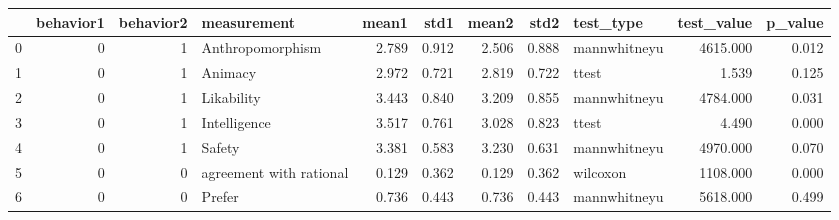\begin{tabular}{lrrlrrrrlrr}
\toprule
{} &  behavior1 &  behavior2 &              measurement &  mean1 &   std1 &  mean2 &   std2 &     test\_type &  test\_value &  p\_value \\
\midrule
0 &          0 &          1 &         Anthropomorphism &  2.789 &  0.912 &  2.506 &  0.888 &  mannwhitneyu &    4615.000 &    0.012 \\
1 &          0 &          1 &                  Animacy &  2.972 &  0.721 &  2.819 &  0.722 &         ttest &       1.539 &    0.125 \\
2 &          0 &          1 &               Likability &  3.443 &  0.840 &  3.209 &  0.855 &  mannwhitneyu &    4784.000 &    0.031 \\
3 &          0 &          1 &             Intelligence &  3.517 &  0.761 &  3.028 &  0.823 &         ttest &       4.490 &    0.000 \\
4 &          0 &          1 &                   Safety &  3.381 &  0.583 &  3.230 &  0.631 &  mannwhitneyu &    4970.000 &    0.070 \\
5 &          0 &          0 &  agreement with rational &  0.129 &  0.362 &  0.129 &  0.362 &      wilcoxon &    1108.000 &    0.000 \\
6 &          0 &          0 &                   Prefer &  0.736 &  0.443 &  0.736 &  0.443 &  mannwhitneyu &    5618.000 &    0.499 \\
\bottomrule
\end{tabular}
